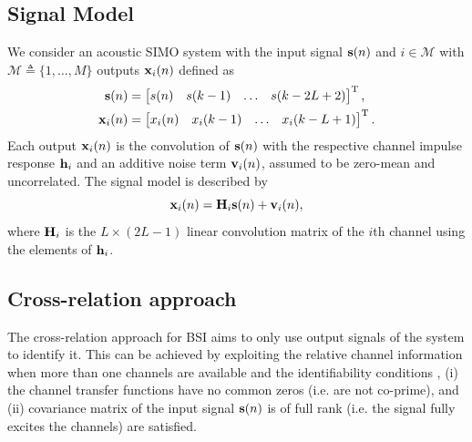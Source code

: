 \documentclass{article}
\newcommand{\h}{\mtxb{h}}
\newcommand{\x}{\mtxb{x}}
\newcommand{\Mset}{\mathcal{M}}
\begin{document}
\subsection{Signal Model}
\label{ssec:signal_model}
We consider an acoustic SIMO system with the input signal \(\bm{\mathrm{s}}(n)\) and \(i \in \Mset\) with \(\Mset \triangleq \{1,\ldots,M\} \) outputs \(\x_i(n)\) defined as
\begin{align}
    \mtxb{s}(n) &= \begin{bmatrix}
        s(n)&s(k-1)&\ldots&s(k-2L+2)
    \end{bmatrix}^{\T},\\
    \x_i(n) &= \begin{bmatrix}
        x_i(n)&x_i(k-1)&\ldots&x_i(k-L+1)
    \end{bmatrix}^{\T}.
\end{align}
Each output \(\x_i(n)\) is the convolution of \(\bm{\mathrm{s}}(n)\) with the respective channel impulse response \(\h_i\) and an additive noise term \(\bm{\mathrm{v}}_i(n)\), assumed to be zero-mean and uncorrelated.
The signal model is described by
\begin{equation}
    \x_i(n) = \mtxb{H}_i \mtxb{s}(n) + \mtxb{v}_i(n),
\end{equation}
where \(\bm{\mathrm{H}}_i\) is the \(L \times (2L-1)\) linear convolution matrix of the \(i\)th channel using the elements of \(\h_i\).

\subsection{Cross-relation approach}
\label{ssec:cross_rel}
The cross-relation approach for BSI aims to only use output signals of the system to identify it.
This can be achieved by exploiting the relative channel information when more than one channels are available and the identifiability conditions \cite{guanghanxuLeastsquaresApproachBlind1995}, (i) the channel transfer functions have no common zeros (i.e. are not co-prime), and (ii) covariance matrix of the input signal \(\bm{\mathrm{s}}(n)\) is of full rank (i.e. the signal fully excites the channels) are satisfied.
\end{document}
